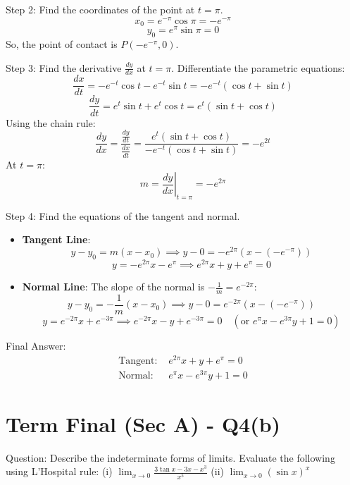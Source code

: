 \documentclass{article}
\begin{document}
Step 2: Find the coordinates of the point at $t = \pi$.
\[
x_0 = e^{-\pi} \cos\pi = -e^{-\pi}
\]
\[
y_0 = e^\pi \sin\pi = 0
\]
So, the point of contact is $P\left(-e^{-\pi}, 0\right)$.

Step 3: Find the derivative $\frac{dy}{dx}$ at $t = \pi$.
Differentiate the parametric equations:
\[
\frac{dx}{dt} = -e^{-t}\cos t - e^{-t}\sin t = -e^{-t}(\cos t + \sin t)
\]
\[
\frac{dy}{dt} = e^t\sin t + e^t\cos t = e^t(\sin t + \cos t)
\]
Using the chain rule:
\[
\frac{dy}{dx} = \frac{\frac{dy}{dt}}{\frac{dx}{dt}} = \frac{e^t(\sin t + \cos t)}{-e^{-t}(\cos t + \sin t)} = -e^{2t}
\]
At $t = \pi$:
\[
m = \left.\frac{dy}{dx}\right|_{t=\pi} = -e^{2\pi}
\]

Step 4: Find the equations of the tangent and normal.
\begin{itemize}
    \item \textbf{Tangent Line}:
    \[
    y - y_0 = m(x - x_0) \implies y - 0 = -e^{2\pi}\left(x - \left(-e^{-\pi}\right)\right)
    \]
    \[
    y = -e^{2\pi} x - e^{\pi} \implies e^{2\pi}x + y + e^\pi = 0
    \]
    \item \textbf{Normal Line}:
    The slope of the normal is $-\frac{1}{m} = e^{-2\pi}$:
    \[
    y - y_0 = -\frac{1}{m}(x - x_0) \implies y - 0 = e^{-2\pi}\left(x - \left(-e^{-\pi}\right)\right)
    \]
    \[
    y = e^{-2\pi} x + e^{-3\pi} \implies e^{-2\pi}x - y + e^{-3\pi} = 0 \quad (\text{or } e^\pi x - e^{3\pi} y + 1 = 0)
    \]
\end{itemize}

Final Answer:
\[
\boxed{
\begin{aligned}
\text{Tangent: } & e^{2\pi}x + y + e^\pi = 0 \\
\text{Normal: } & e^\pi x - e^{3\pi}y + 1 = 0
\end{aligned}
}
\]

\section*{Term Final (Sec A) - Q4(b)}
Question:
Describe the indeterminate forms of limits. Evaluate the following using L'Hospital rule:
(i) $\lim_{x \to 0} \frac{3 \tan x - 3x - x^3}{x^5}$ \quad
(ii) $\lim_{x \to 0} (\sin x)^x$
\end{document}
